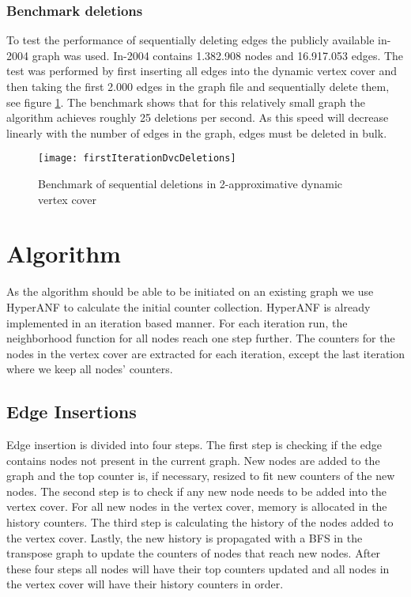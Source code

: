 \subsubsection{Benchmark deletions}
To test the performance of sequentially deleting edges the publicly available in-2004 graph was used. In-2004 contains 1.382.908 nodes and 16.917.053 edges. The test was performed by first inserting all edges into the dynamic vertex cover and then taking the first 2.000 edges in the graph file and sequentially delete them, see figure \ref{fig:firstIterationDvcDeletion}. The benchmark shows that for this relatively small graph the algorithm achieves roughly 25 deletions per second. As this speed will decrease linearly with the number of edges in the graph, edges must be deleted in bulk.


\begin{figure}[h]
\centering
\texttt{[image: firstIterationDvcDeletions]}    
\captionsetup{justification=centering}
\caption {Benchmark of sequential deletions in 2-approximative dynamic vertex cover}
\label{fig:firstIterationDvcDeletion}
\end{figure}


\section{Algorithm}


As the algorithm should be able to be initiated on an existing graph we use HyperANF to calculate the initial counter collection. HyperANF is already implemented in an iteration based manner. For each iteration run, the neighborhood function for all nodes reach one step further. The counters for the nodes in the vertex cover are extracted for each iteration, except the last iteration where we keep all nodes' counters. 

\subsection{Edge Insertions}

Edge insertion is divided into four steps. The first step is checking if the edge contains nodes not present in the current graph. New nodes are added to the graph and the top counter is, if necessary, resized to fit new counters of the new nodes. The second step is to check if any new node needs to be added into the vertex cover. For all new nodes in the vertex cover, memory is allocated in the history counters. The third step is calculating the history of the nodes added to the vertex cover. Lastly, the new history is propagated with a BFS in the transpose graph to update the counters of nodes that reach new nodes. After these four steps all nodes will have their top counters updated and all nodes in the vertex cover will have their history counters in order. 

